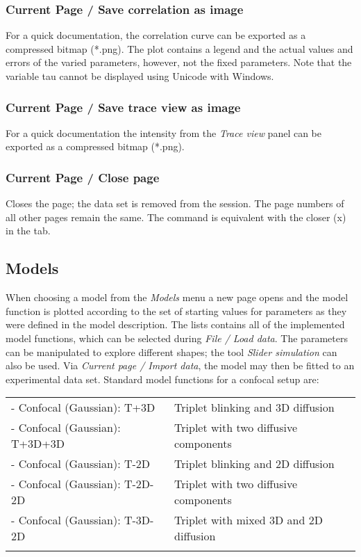 \subsubsection{Current Page / Save correlation as image}
\label{sec:menub.curre.savec}
For a quick documentation, the correlation curve can be exported as a compressed bitmap (*.png). The plot contains a legend and the actual values and errors of the varied parameters, however, not the fixed parameters. Note that the variable tau cannot be displayed using Unicode with Windows.

\subsubsection{Current Page / Save trace view as image}
\label{sec:menub.curre.savet}
For a quick documentation the intensity from the \textit{Trace view} panel can be exported as a compressed bitmap (*.png). 

\subsubsection{Current Page / Close page}
\label{sec:menub.curre.close}
Closes the page; the data set is removed from the session. The page numbers of all other pages remain the same. The command is equivalent with the closer (x) in the tab. 

\subsection{Models}
\label{sec:model}
When choosing a model from the \textit{Models} menu a new page opens and the model function is plotted according to the set of starting values for parameters as they were defined in the model description. The lists contains all of the implemented model functions, which can be selected during \textit{File / Load data}. The parameters can be manipulated to explore different shapes; the tool \textit{Slider simulation} can also be used. Via \textit{Current page / Import data}, the model may then be fitted to an experimental data set. 
Standard model functions for a confocal setup are:

\begin{tabular}{l l}
\rule{0pt}{3ex} - Confocal (Gaussian): T+3D & Triplet blinking and 3D diffusion \\
\rule{0pt}{3ex} - Confocal (Gaussian): T+3D+3D & Triplet with two diffusive components \\
\rule{0pt}{3ex} - Confocal (Gaussian): T-2D &  Triplet blinking and 2D diffusion \\
\rule{0pt}{3ex} - Confocal (Gaussian): T-2D-2D & Triplet with two diffusive components \\
\rule{0pt}{3ex} - Confocal (Gaussian): T-3D-2D &  Triplet with mixed 3D and 2D diffusion \\
\rule{0pt}{3ex}
\end{tabular}

